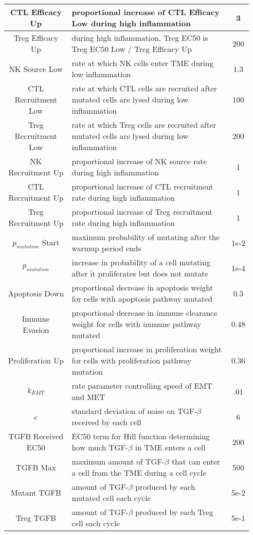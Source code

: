 \documentclass[11pt, a4paper, preprint]{article}
\begin{document}
\begin{center}
\begin{longtable}{||c | p{10cm} | c||}
  CTL Efficacy Up & proportional increase of CTL Efficacy Low during high inflammation & 3 \\
  \hline
  Treg Efficacy Up & during high inflammation, Treg EC50 is Treg EC50 Low / Treg Efficacy Up & 200 \\
  \hline
  NK Source Low & rate at which NK cells enter TME during low inflammation & 1.3 \\ 
  \hline
  CTL Recruitment Low & rate at which CTL cells are recruited after mutated cells are lysed during low inflammation & 100 \\ 
  \hline
  Treg Recruitment Low & rate at which Treg cells are recruited after mutated cells are lysed during low inflammation & 200 \\
  \hline
  NK Recruitment Up & proportional increase of NK source rate during high inflammation & 1 \\
  \hline
  CTL Recruitment Up & proportional increase of CTL recruitment rate during high inflammation & 1 \\
  \hline
   Treg Recruitment Up & proportional increase of Treg recruitment rate during high inflammation & 1 \\
  \hline
  $p_{mutation}$ Start & maximum probability of mutating after the warmup period ends & 1e-2 \\
  \hline
  $p_{mutation}$ & increase in probability of a cell mutating after it proliferates but does not mutate & 1e-4 \\
  \hline
  Apoptosis Down & proportional decrease in apoptosis weight for cells with apoptosis pathway mutated & 0.3 \\
  \hline
  Immune Evasion & proportional decrease in immune clearance weight for cells with immune pathway mutated & 0.48 \\
  \hline
  Proliferation Up & proportional increase in proliferation weight for cells with proliferation pathway mutation & 0.36 \\
  \hline
  $k_{EMT}$ & rate parameter controlling speed of EMT and MET & .01 \\
  \hline
  c & standard deviation of noise on TGF-$\beta$ received by each cell & 6 \\
  \hline
  TGFB Received EC50 & EC50 term for Hill function determining how much TGF-$\beta$ in TME enters a cell & 200 \\
  \hline
  TGFB Max & maximum amount of TGF-$\beta$ that can enter a cell from the TME during a cell cycle & 500 \\
  \hline 
  Mutant TGFB & amount of TGF-$\beta$ produced by each mutated cell each cycle & 5e-2 \\
  \hline
  Treg TGFB & amount of TGF-$\beta$ produced by each Treg cell each cycle & 5e-1 \\
  \hline
\end{longtable}
\end{center}
\end{document}
